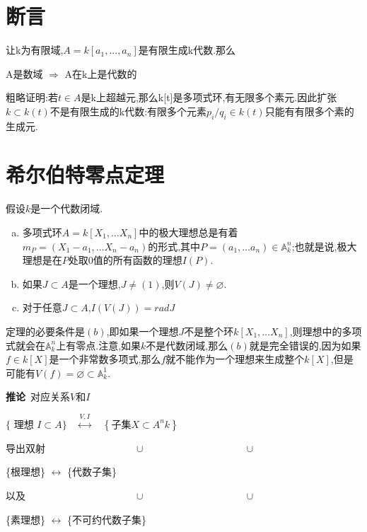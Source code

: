 \documentclass[UTF8]{book}
\begin{document}
	\section{断言}
		让k为有限域,$A=k[a_{1},...,a_{n}]$是有限生成k代数.那么
		
		
		\begin{center}
			A是数域 $\Rightarrow$ A在k上是代数的
		\end{center}
		
		
		粗略证明:若$t\in A$是k上超越元,那么k[t]是多项式环,有无限多个素元.因此扩张$k\subset k(t)$不是有限生成的k代数:有限多个元素$p_{i}/q_{i}\in k(t)$只能有有限多个素的生成元.
	\section{希尔伯特零点定理}
		假设$ k $是一个代数闭域.
		\begin{enumerate}[(a)]
			\item 多项式环$A=k \left[X_{1}, \dots X_{n}\right]$中的极大理想总是有着$m_{P}=\left(X_{1}-a_{1}, \ldots X_{n}-a_{n}\right)$的形式,其中$P=\left(a_{1}, \ldots a_{n}\right) \in \mathbb{A}^{n}_{k}$;也就是说,极大理想是在$ P $处取0值的所有函数的理想$ I(P) $.
			\item 如果$J \subset A$是一个理想,$J \neq(1)$,则$V (J ) \neq \varnothing$.
			\item 对于任意$J \subset A$,$ I(V(J)) = rad J$
		\end{enumerate}
		定理的必要条件是$ (b) $,即如果一个理想$ J $不是整个环$ k \left[X_{1}, \dots X_{n}\right] $,则理想中的多项式就会在$ \mathbb{A}^{n}_{k} $上有零点.注意,如果$ k $不是代数闭域,那么$   (b) $就是完全错误的,因为如果$f \in k [ X ]$是一个非常数多项式,那么$ f $就不能作为一个理想来生成整个$ k [ X ] $,但是可能有$ V(f) = \varnothing \subset \mathbb{A}^{1}_{k} $.
		
		
		\textbf{推论}\ 对应关系$ V $和$ I $
		
		
		\centerline{$\{\text { 理想 } I \subset A \}\quad{\stackrel{ V , I }{\longleftrightarrow}} \quad\left\{\text {子集} X \subset A ^{ n } k \right\}$}
		
		
		导出双射$ \qquad\qquad\qquad\qquad\quad\cup\qquad\qquad\qquad\qquad\qquad\cup $
		

		\centerline{\{根理想\} \qquad $\longleftrightarrow$ \qquad \{代数子集\}}
		
		
		以及$ \qquad\qquad\qquad\qquad\qquad\quad\cup\qquad\qquad\qquad\qquad\qquad\cup $
		
		
		\centerline{\qquad\quad \{素理想\} \qquad $\longleftrightarrow$ \qquad \{不可约代数子集\}}
		
\end{document}
